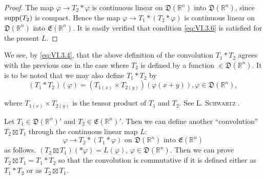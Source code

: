 \begin{proof}
 The map $\varphi \to T_2 * \varphi$ is continuous linear on $\mathfrak{D}(\mathbb{R}^{n})$ into $\mathfrak{D}(\mathbb{R}^{n})$, since $\operatorname{supp}(T_2)$ is compact. Hence the map $\varphi \to T_1 * (T_2 * \varphi)$ is continuous linear on $\mathfrak{D}(\mathbb{R}^{n})$ into $\mathfrak{E}(\mathbb{R}^{n})$. It is easily verified that condition \eqref{eq:VI.3.6} is satisfied for the present $L$. 
\end{proof}

\begin{remarku} We see, by \eqref{eq:VI.3.4}, that the above definition of the convolution $T_{1} \ast T_{2}$ agrees with the previous one in the case where $T_{2}$ is defined by a function $\in \mathfrak{D}(\mathbb{R}^{n})$. It is to be noted that we may also define $T_{1} \ast T_{2}$ by 
\begin{equation}\tag{8'}\label{eq:VI.3.8'}
\left(T _{1} * T _{2}\right) (\varphi) = \left(T _{1(x)} \times T _{2(y)}\right) (\varphi (x + y)), \varphi \in \mathfrak {D} \left(\mathbb{R}^{n}\right),
\end{equation}
\end{remarku}

where $T_{1(x)} \times T_{2(y)}$ is the tensor product of $T_{1}$ and $T_{2}$. See L. \textsc{Schwartz} \cite{schwartz294}. 

\begin{theorem}\label{thm:VI.3.Theorem.3} Let $T_{1} \in \mathfrak{D}(\mathbb{R}^{n})'$ and $T_{2} \in \mathfrak{E}(\mathbb{R}^{n})'$. Then we can define another ``convolution'' $T_{2} \boxtimes T_{1}$ through the continuous linear map $L$: 
\[
\varphi \rightarrow T _{2} * (T _{1} * \varphi) \text{ on } \mathfrak {D} (\mathbb{R}^{n}) \text{ into } \mathfrak {E} (\mathbb{R}^{n})
\]
as follows. $(T_{2} \boxtimes T_{1}) (*\varphi) = L(\varphi)$, $\varphi \in \mathfrak{D}(\mathbb{R}^{n})$. Then we can prove $T_{2} \boxtimes T_{1} = T_{1} * T_{2}$ so that the convolution is commutative if it is defined either as $T_{1} * T_{2}$ or as $T_{2} \boxtimes T_{1}$. 
\end{theorem}

